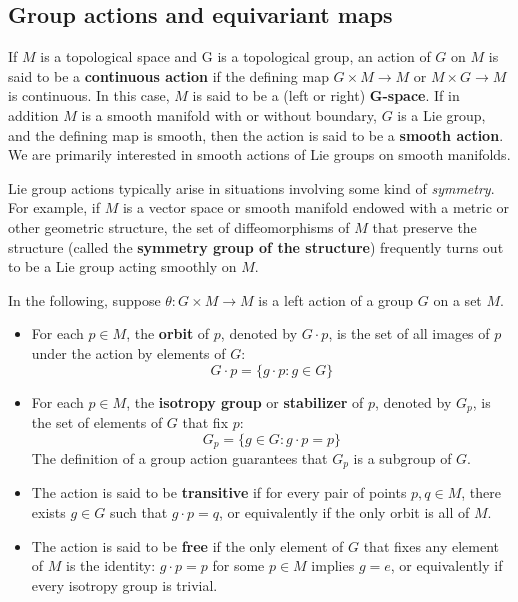\subsection{Group actions and equivariant maps}
If $M$ is a topological space and G is a topological group, an action of $G$ on $M$ is said to be a \textbf{continuous action} if the defining map $G\times M\to M$ or $M\times G\to M$ is continuous. In this case, $M$ is said to be a (left or right) \textbf{$\bm{G}$-space}. If in addition $M$ is a smooth manifold with or without boundary, $G$ is a Lie group, and the defining map
is smooth, then the action is said to be a \textbf{smooth action}. We are primarily interested in smooth actions of Lie groups on smooth manifolds.\par
Lie group actions typically arise in situations involving some kind of \textit{symmetry}. For example, if $M$ is a vector space or smooth manifold endowed with a metric or other geometric structure, the set of diffeomorphisms of $M$ that preserve the structure (called the \textbf{symmetry group of the structure}) frequently turns out to be a Lie group acting smoothly on $M$.\par
In the following, suppose $\theta:G\times M\to M$ is a left action of a group $G$ on a set $M$.
\begin{itemize}
\item For each $p\in M$, the \textbf{orbit} of $p$, denoted by $G\cdot p$, is the set of all images of $p$ under the action by elements of $G$:
\[G\cdot p=\{g\cdot p:g\in G\}\]
\item For each $p\in M$, the \textbf{isotropy group} or \textbf{stabilizer} of $p$, denoted by $G_p$, is the set of elements of $G$ that fix $p$:
\[G_p=\{g\in G:g\cdot p=p\}\]
The definition of a group action guarantees that $G_p$ is a subgroup of $G$.
\item The action is said to be \textbf{transitive} if for every pair of points $p,q\in M$, there exists $g\in G$ such that $g\cdot p=q$, or equivalently if the only orbit is all of $M$.
\item The action is said to be \textbf{free} if the only element of $G$ that fixes any element of $M$ is the identity: $g\cdot p=p$ for some $p\in M$ implies $g=e$, or equivalently if every isotropy group is trivial.
\end{itemize}
